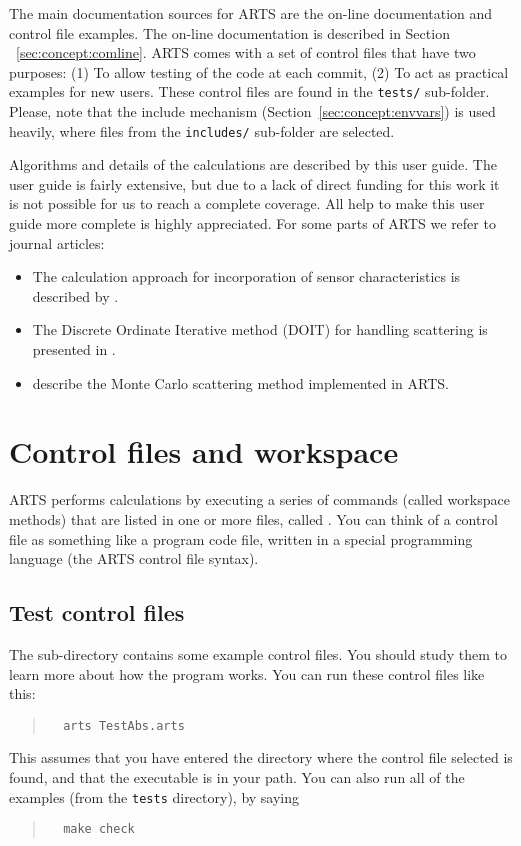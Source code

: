 The main documentation sources for ARTS are the on-line documentation
and control file examples. The on-line documentation is described in
Section ~\ref{sec:concept:comline}. ARTS comes with a set of control
files that have two purposes: (1) To allow testing of the code at each
commit, (2) To act as practical examples for new users. These control
files are found in the \verb|tests/| sub-folder. Please, note that the
include mechanism (Section~\ref{sec:concept:envvars}) is used heavily,
where files from the \verb|includes/| sub-folder are selected.

Algorithms and details of the calculations are described by this user
guide. The user guide is fairly extensive, but due to a lack of direct
funding for this work it is not possible for us to reach a complete
coverage. All help to make this user guide more complete is highly
appreciated. For some parts of ARTS we refer to journal articles:
\begin{itemize}
\item The calculation approach for incorporation of sensor
  characteristics is described by \citet{eriksson:06}.
\item The Discrete Ordinate Iterative method (DOIT) for handling scattering
  is presented in \citet{emde04:_doit_jgr}.
\item \citet{davisetal:04} describe the Monte Carlo scattering method
  implemented in ARTS.
\end{itemize}


\section{Control files and workspace}

ARTS performs calculations by executing a series of commands (called
workspace methods) that are listed in one or more files, called
. You can think of a control file as something like a
program code file, written in a special programming language (the ARTS
control file syntax).

\subsection{Test control files}

The sub-directory  contains some example control files.
You should study them to learn more about how the program works. You
can run these control files like this:
\begin{quote}
\begin{verbatim}
  arts TestAbs.arts
\end{verbatim}
\end{quote}
This assumes that you have entered the directory where the control
file selected is found, and that the  executable is in
your path. You can also run all of the examples (from the \verb|tests|
directory), by saying
\begin{quote}
\begin{verbatim}
  make check
\end{verbatim}
\end{quote}


